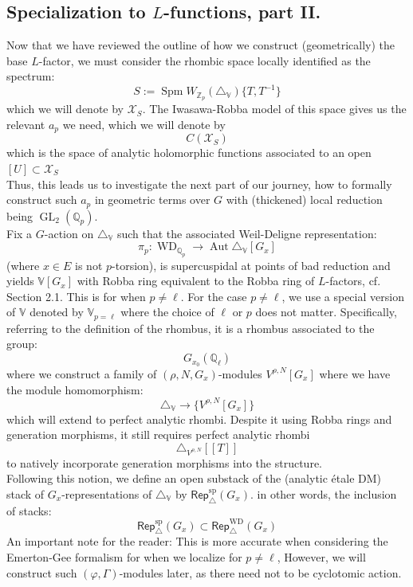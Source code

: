 \documentclass[9pt]{amsart}
\let\texcal\mathcal
\renewcommand{\[}{\begin{equation}}
\renewcommand{\]}{\end{equation}}
\newcommand{\on}{\operatorname}
\theoremstyle{plain}
\theoremstyle{remark}
\begin{document}
\subsection{Specialization to $L$-functions, part II.} Now that we have reviewed the outline of how we construct (geometrically) the base $L$-factor, we must consider the rhombic space locally identified as the spectrum:
\[S := \on{Spm} W_{\mathbb{Z}_p}(\triangle_{\mathbb{V}})\{T, T^{-1}\}\]
which we will denote by $\texcal{X}_S$. The Iwasawa-Robba model of this space gives us the relevant $a_p$ we need, which we will denote by \[C(\texcal{X}_S)\] which is the space of analytic holomorphic functions associated to an open $[U] \subset \texcal{X}_S$\\
Thus, this leads us to investigate the next part of our journey, how to formally construct such $a_p$ in geometric terms over $G$ with (thickened) local reduction being $\on{GL}_2(\mathbb{Q}_p)$.\\
Fix a $G$-action on $\triangle_{\mathbb{V}}$ such that the associated Weil-Deligne representation:
\[\pi_p: \on{WD}_{\mathbb{Q}_p} \to \on{Aut}
\triangle_{\mathbb{V}}[G_x]\]
(where $x \in E$ is not $p$-torsion), is supercuspidal at points of bad reduction and yields $\mathbb{V}[G_x]$ with Robba ring equivalent to the Robba ring of $L$-factors, cf. Section 2.1. This is for when $p \neq \ell$. For the case $p \neq \ell$, we use a special version of $\mathbb{V}$ denoted by $\mathbb{V}_{p=\ell}$ where the choice of $\ell$ or $p$ does not matter. Specifically, referring to the definition of the rhombus, it is a rhombus associated to the group:
\[G_{x_0}(\mathbb{Q}_{\ell})\]
where we construct a family of $(\rho, N, G_x)$-modules $V^{\rho, N}[G_x]$ where we have the module homomorphism:
\[\triangle_{\mathbb{V}} \to \{V^{\rho, N}[G_x]\}\]
which will extend to perfect analytic rhombi. Despite it using Robba rings and generation morphisms, it still requires perfect analytic rhombi \[\triangle_{V^{\rho, N}}[[T]]\] to natively incorporate generation morphisms into the structure.\\
Following this notion, we define an open substack of the (analytic étale DM) stack of $G_x$-representations of $\triangle_{\mathbb{V}}$ by $\mathsf{Rep}^{\text{sp}}_{\triangle}
(G_x)$.
in other words, the inclusion of stacks: 
\[\mathsf{Rep}^{\text{sp}}_{\triangle}
(G_x) \subset \mathsf{Rep}^{\text{WD}}_{\triangle}
(G_x)\]
An important note for the reader: This is more accurate when considering the Emerton-Gee formalism for when we localize for $p \neq \ell$, However, we will construct such $(\varphi, \Gamma)$-modules later, as there need not to be cyclotomic action.\\
\end{document}

